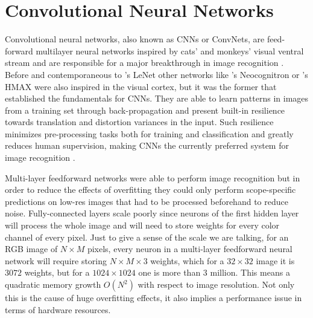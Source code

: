 
\section{Convolutional Neural Networks}
\label{sec:theory:convnets}
Convolutional neural networks, also known as CNNs or ConvNets, are feed-forward multilayer neural networks inspired by cats' and monkeys' visual ventral stream \cite{Hubel1968,Lawrence1997} and are responsible for a major breakthrough in image recognition \cite{LeCun1995}.
Before and contemporaneous to \citeauthor{LeCun1998}'s LeNet \cite{LeCun1998} other networks like \citeauthor{Fukushima1980}'s Neocognitron \cite{Fukushima1980} or \citeauthor{Riesenhuber1999}'s HMAX \cite{Riesenhuber1999} were also inspired in the visual cortex, but it was the former that established the fundamentals for CNNs.
They are able to learn patterns in images from a training set through back-propagation and present built-in resilience towards translation and distortion variances in the input.
Such resilience minimizes pre-processing tasks both for training and classification and greatly reduces human supervision, making CNNs the currently preferred system for image recognition \cite{Visin2015}.

Multi-layer feedforward networks were able to perform image recognition \cite{Zhang1999} but in order to reduce the effects of overfitting they could only perform scope-specific predictions on low-res images that had to be processed beforehand to reduce noise.
Fully-connected layers scale poorly since neurons of the first hidden layer will process the whole image and will need to store weights for every color channel of every pixel.
Just to give a sense of the scale we are talking, for an RGB image of ${N}\times{M}$ pixels, every neuron in a multi-layer feedforward neural network will require storing ${N}\times{M}\times{3}$ weights, which for a ${32}\times{32}$ image it is $3072$ weights, but for a ${1024}\times{1024}$ one is more than $3$ million.
This means a quadratic memory growth $O(N^2)$ with respect to image resolution.
Not only this is the cause of huge overfitting effects, it also implies a performance issue in terms of hardware resources.

